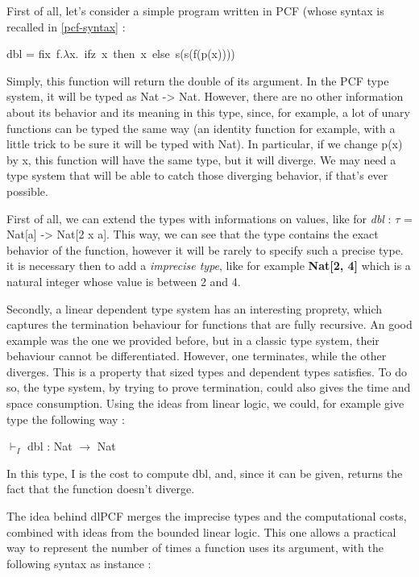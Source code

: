 \documentclass[a4paper,12pt]{report}
\begin{document}
First of all, let's consider a simple program written in PCF (whose syntax is
recalled in \ref{pcf-syntax} :

\begin{center} 
  dbl = fix~f.$\lambda $x.~ifz~x~then~x~else~s(s(f(p(x)))) 
\end{center}

Simply, this function will return the double of its argument. In the PCF type
system, it will be typed as Nat -> Nat. However, there are no other
information about its behavior and its meaning in this type, since, for example,
a lot of unary functions can be typed the same way (an identity function for
example, with a little trick to be sure it will be typed with Nat). In
particular, if we change p(x) by x, this function will have the same type, but
it will diverge. We may need a type system that will be able to catch those
diverging behavior, if that's ever possible.

First of all, we can extend the types with informations on values, like for
\emph{dbl} : $\tau$ = Nat[a] -> Nat[2 x a]. This way, we can see that the type
contains the exact behavior of the function, however it will be rarely to
specify such a precise type. it is necessary then to add a \emph{imprecise
  type}, like for example \textbf{Nat[2, 4]} which is a natural integer whose
value is between 2 and 4.

\medskip

Secondly, a linear dependent type system has an interesting proprety, which
captures the termination behaviour for functions that are fully recursive. An
good example was the one we provided before, but in a classic type system, their
behaviour cannot be differentiated. However, one terminates, while the other
diverges. This is a property that sized types and dependent types satisfies. To
do so, the type system, by trying to prove termination, could also gives the
time and space consumption. Using the ideas from linear logic, we could, for
example give type the following way :

\begin{center}
$\vdash_{I}$ dbl : Nat $\rightarrow$ Nat
\end{center}

In this type, I is the cost to compute dbl, and, since it can be given, returns
the fact that the function doesn't diverge.

The idea behind dlPCF merges the imprecise types and the computational costs,
combined with ideas from the bounded linear logic. This one allows a practical
way to represent the number of times a function uses its argument, with the
following syntax as instance :
\end{document}
